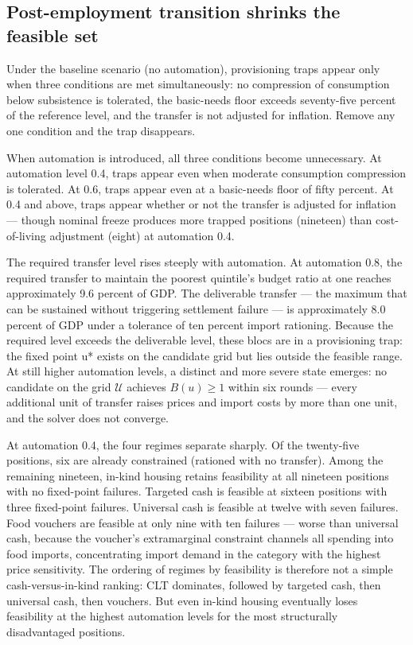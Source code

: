 \documentclass[preprint,review,12pt]{elsarticle}
\begin{document}
\subsection{Post-employment transition shrinks the feasible set}

Under the baseline scenario (no automation), provisioning traps appear
only when three conditions are met simultaneously: no compression of
consumption below subsistence is tolerated, the basic-needs floor
exceeds seventy-five percent of the reference level, and the transfer is
not adjusted for inflation. Remove any one condition and the trap
disappears.

When automation is introduced, all three conditions become unnecessary.
At automation level 0.4, traps appear even when moderate consumption
compression is tolerated. At 0.6, traps appear even at a basic-needs
floor of fifty percent. At 0.4 and above, traps appear whether or not
the transfer is adjusted for inflation --- though nominal freeze
produces more trapped positions (nineteen) than cost-of-living
adjustment (eight) at automation 0.4.

The required transfer level rises steeply with automation. At automation
0.8, the required transfer to maintain the poorest quintile's budget
ratio at one reaches approximately 9.6 percent of GDP. The deliverable
transfer --- the maximum that can be sustained without triggering
settlement failure --- is approximately 8.0 percent of GDP under a
tolerance of ten percent import rationing. Because the required level
exceeds the deliverable level, these blocs are in a provisioning trap:
the fixed point u* exists on the candidate grid but lies outside the
feasible range. At still higher automation levels, a distinct and more
severe state emerges: no candidate on the grid \(\mathcal{U}\) achieves
\(B(u) \geq 1\) within six rounds --- every additional unit of transfer
raises prices and import costs by more than one unit, and the solver
does not converge.

At automation 0.4, the four regimes separate sharply. Of the twenty-five
positions, six are already constrained (rationed with no transfer).
Among the remaining nineteen, in-kind housing retains feasibility at all
nineteen positions with no fixed-point failures. Targeted cash is
feasible at sixteen positions with three fixed-point failures. Universal
cash is feasible at twelve with seven failures. Food vouchers are
feasible at only nine with ten failures --- worse than universal cash,
because the voucher's extramarginal constraint channels all spending
into food imports, concentrating import demand in the category with the
highest price sensitivity. The ordering of regimes by feasibility is
therefore not a simple cash-versus-in-kind ranking: CLT dominates,
followed by targeted cash, then universal cash, then vouchers. But even
in-kind housing eventually loses feasibility at the highest automation
levels for the most structurally disadvantaged positions.
\end{document}

